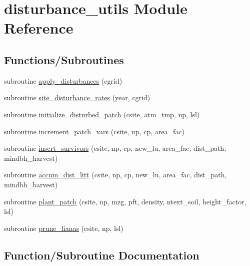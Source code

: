 \hypertarget{namespacedisturbance__utils}{}\section{disturbance\+\_\+utils Module Reference}
\label{namespacedisturbance__utils}
\subsection*{Functions/\+Subroutines}
\begin{DoxyCompactItemize}
\item 
subroutine \hyperlink{namespacedisturbance__utils_a29d6db4e94463404643e5c3666c67767}{apply\+\_\+disturbances} (cgrid)
\item 
subroutine \hyperlink{namespacedisturbance__utils_a9045765ed99ce8acf000838b2c532deb}{site\+\_\+disturbance\+\_\+rates} (year, cgrid)
\item 
subroutine \hyperlink{namespacedisturbance__utils_a31b6105dc67086438d6827bbffaf4bc4}{initialize\+\_\+disturbed\+\_\+patch} (csite, atm\+\_\+tmp, np, lsl)
\item 
subroutine \hyperlink{namespacedisturbance__utils_a60d031d31fcde31370f73cebaaaadb24}{increment\+\_\+patch\+\_\+vars} (csite, np, cp, area\+\_\+fac)
\item 
subroutine \hyperlink{namespacedisturbance__utils_ac25d6a408136dff3bccca56269ca858f}{insert\+\_\+survivors} (csite, np, cp, new\+\_\+lu, area\+\_\+fac, dist\+\_\+path, mindbh\+\_\+harvest)
\item 
subroutine \hyperlink{namespacedisturbance__utils_a5e78ef6d3bd2f31c0abfaf8e86045187}{accum\+\_\+dist\+\_\+litt} (csite, np, cp, new\+\_\+lu, area\+\_\+fac, dist\+\_\+path, mindbh\+\_\+harvest)
\item 
subroutine \hyperlink{namespacedisturbance__utils_ac78f23ae05ca7cd196ebeeda52e66507}{plant\+\_\+patch} (csite, np, mzg, pft, density, ntext\+\_\+soil, height\+\_\+factor, lsl)
\item 
subroutine \hyperlink{namespacedisturbance__utils_adea8e04f93328f6e7137a5c490d0615a}{prune\+\_\+lianas} (csite, np, lsl)
\end{DoxyCompactItemize}


\subsection{Function/\+Subroutine Documentation}
\mbox{\label{namespacedisturbance__utils_a5e78ef6d3bd2f31c0abfaf8e86045187}} 
